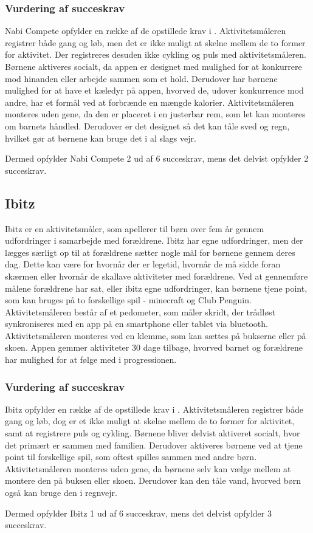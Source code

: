 \subsubsection{Vurdering af succeskrav}
Nabi Compete opfylder en række af de opstillede krav i . Aktivitetsmåleren registrer både gang og løb, men det er ikke muligt at skelne mellem de to former for aktivitet. Der registreres desuden ikke cykling og puls med aktivitetsmåleren. 
Børnene aktiveres socialt, da appen er designet med mulighed for at konkurrere mod hinanden eller arbejde sammen som et hold. Derudover har børnene mulighed for at have et kæledyr på appen, hvorved de, udover konkurrence mod andre, har et formål ved at forbrænde en mængde kalorier. Aktivitetsmåleren monteres uden gene, da den er placeret i en justerbar rem, som let kan monteres om barnets håndled. Derudover er det designet så det kan tåle sved og regn, hvilket gør at børnene kan bruge det i al slags vejr. 

Dermed opfylder Nabi Compete 2 ud af 6 succeskrav, mens det delvist opfylder 2 succeskrav.

\subsection{Ibitz}
Ibitz er en aktivitetsmåler, som apellerer til børn over fem år gennem udfordringer i samarbejde med forældrene. Ibitz har egne udfordringer, men der lægges særligt op til at forældrene sætter nogle mål for børnene gennem deres dag. Dette kan være for hvornår der er legetid, hvornår de må sidde foran skærmen eller hvornår de skallave aktiviteter med forældrene. Ved at gennemføre målene forældrene har sat, eller ibitz egne udfordringer, kan børnene tjene point, som kan bruges på to forskellige spil - minecraft og Club Penguin. Aktivitetsmåleren består af et pedometer, som måler skridt, der trådløst synkroniseres med en app på en smartphone eller tablet via bluetooth. Aktivitetsmåleren monteres ved en klemme, som kan sættes på bukserne eller på skoen. Appen gemmer aktiviteter 30 dage tilbage, hvorved barnet og forældrene har mulighed for at følge med i progressionen. 

\subsubsection{Vurdering af succeskrav}
Ibitz opfylder en række af de opstillede krav i . Aktivitetsmåleren registrer både gang og løb, dog er et ikke muligt at skelne mellem de to former for aktivitet, samt at registrere puls og cykling. Børnene bliver delvist aktiveret socialt, hvor det primært er sammen med familien. Derudover aktiveres børnene ved at tjene point til forskellige spil, som oftest spilles sammen med andre børn. Aktivitetsmåleren monteres uden gene, da børnene selv kan vælge mellem at montere den på buksen eller skoen. Derudover kan den tåle vand, hvorved børn også kan bruge den i regnvejr.  

Dermed opfylder Ibitz 1 ud af 6 succeskrav, mens det delvist opfylder 3 succeskrav.

